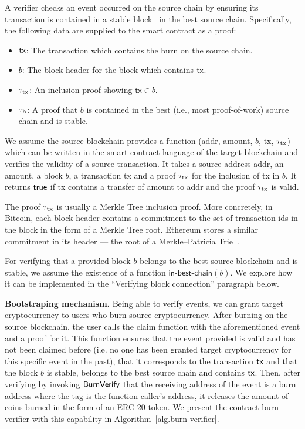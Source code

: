 A verifier checks an event occurred on the source chain by ensuring its transaction is contained in a stable block~\cite{EC:GarKiaLeo15,C:GarKiaLeo17} in the best source chain. Specifically, the following data are supplied to the smart contract as a proof:

\begin{itemize}
  \item $\textsf{tx}$: The transaction which contains the burn on the source chain.
  \item $b$: The block header for the block which contains $\textsf{tx}$.
  \item $\tau_\text{tx}$: An inclusion proof showing $\mathsf{tx} \in b$.
  \item $\tau_\text{b}$: A proof that $b$ is contained in the best (i.e., most proof-of-work) source chain and is stable.
\end{itemize}

We assume the source blockchain provides a function \verifytx(\textsf{addr}, \textsf{amount}, $b$, \textsf{tx}, $\tau_\text{tx}$) which can be written in the smart contract language of the target blockchain and verifies the validity of a source transaction. It takes a source address \textsf{addr}, an \textsf{amount}, a block $b$, a transaction \textsf{tx} and a proof $\tau_\text{tx}$ for the inclusion of \textsf{tx} in $b$. It returns $\mathsf{true}$ if \textsf{tx} contains a transfer of \textsf{amount} to \textsf{addr} and the proof $\tau_\text{tx}$ is valid.

The proof $\tau_\text{tx}$ is usually a Merkle Tree inclusion proof. More concretely, in Bitcoin, each block header contains a commitment to the set of transaction ids in the block in the form of a Merkle Tree root. Ethereum stores a similar commitment in its header --- the root of a Merkle--Patricia Trie~\cite{wood2014ethereum}.

For verifying that a provided block $b$ belongs to the best source blockchain and is stable, we assume the existence of a function $\textsf{in-best-chain}(b)$. We explore how it can be implemented in the ``Verifying block connection'' paragraph below.

\noindent
\textbf{Bootstraping mechanism.}
Being able to verify events, we can grant target cryptocurrency to users who burn source cryptocurrency. After burning on the source blockchain, the user calls the \textsf{claim} function with the aforementioned event and a proof for it. This function ensures that the event provided is valid and has not been claimed before (i.e. no one has been granted target cryptocurrency for this specific event in the past), that it corresponds to the transaction $\textsf{tx}$ and that the block $b$ is stable, belongs to the best source chain and contains $\textsf{tx}$. Then, after verifying by invoking $\mathsf{BurnVerify}$ that the receiving address of the event is a burn address where the tag is the function caller's address, it releases the amount of coins burned in the form of an ERC-20 token. We present the contract \textsf{burn-verifier} with this capability in Algorithm~\ref{alg.burn-verifier}.

